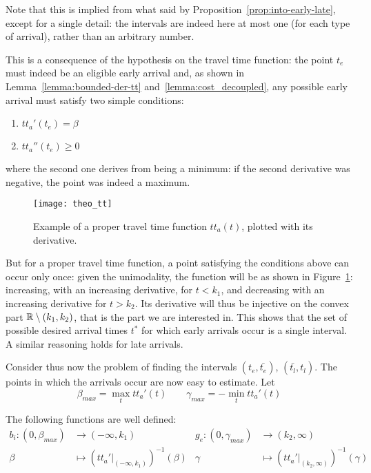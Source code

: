 Note that this is implied from what said by Proposition~\ref{prop:into-early-late},
except for a single detail:
the intervals are indeed here at most one (for each type of arrival), rather than an arbitrary number.

This is a consequence of the hypothesis on the travel time function:
the point \(t_e\) must indeed be an eligible early arrival and,
as shown in Lemma~\ref{lemma:bounded-der-tt} and~\ref{lemma:cost_decoupled},
any possible early arrival must satisfy two simple conditions:
\begin{enumerate}
\item \(tt_a'(t_e) = \beta\)
\item \(tt_a''(t_e) \geq 0\)
\end{enumerate}
where the second one derives from being a minimum:
if the second derivative was negative, the point was indeed a maximum.

\begin{figure}
  \centering
  \texttt{[image: theo\_tt]}
  \caption{
    Example of a proper travel time function \(tt_a(t)\),
  plotted with its derivative.}
  \label{fig:theo_tt}
\end{figure}

But for a proper travel time function,
a point satisfying the conditions above can occur only once:
given the unimodality,
the function will be as shown in Figure~\ref{fig:theo_tt}: increasing, with an increasing derivative,
for \(t < k_1\), and decreasing with an increasing derivative for \(t > k_2\).
Its derivative will thus be injective on the convex part \(\mathbb{R} \setminus (k_1, k_2)\),
that is the part we are interested in.
This shows that the set of possible desired arrival times \(t^*\) for which early arrivals occur is a single interval.
A similar reasoning holds for late arrivals.

Consider thus now the problem of finding the intervals \((t_e, \bar{t_e})\), \((\bar{t_l}, t_l)\).
The points in which the arrivals occur are now easy to estimate. Let
\begin{equation*}
  \beta_{max} = \max_t tt_a'(t)\qquad \gamma_{max} = -\min_t tt_a'(t)
\end{equation*}

The following functions are well defined:
\begin{align*}
  b_i: (0, \beta_{max}) & \rightarrow (-\infty, k_1)  & g_e: (0, \gamma_{max}) & \rightarrow (k_2, \infty) \\
       \beta & \mapsto (tt_a' |_{(-\infty, k_1)})^{-1}(\beta) & \gamma & \mapsto(tt_a' |_{(k_2, \infty)})^{-1}(\gamma)
\end{align*}

